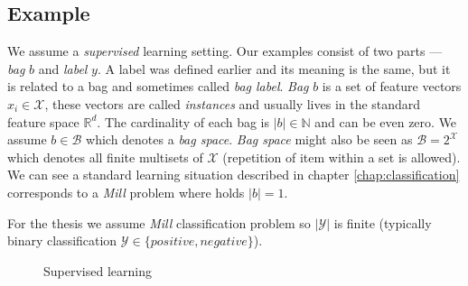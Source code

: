 \subsection*{Example}
We assume a \emph{supervised} learning setting. Our examples consist of two parts --- \emph{bag} $b$ and \emph{label} $y$. A label was defined earlier and its meaning is the same, but it is related to a bag and sometimes called \emph{bag label}. \emph{Bag} $b$ is a set of feature vectors $x_i\in\mathcal{X}$, these vectors are called \emph{instances} and usually lives in the standard feature space $\mathbb{R}^{d}$. The cardinality of each bag is $|b| \in \mathbb{N}$ and can be even zero. We assume $b \in \mathcal{B}$ which denotes a \emph{bag space}. \emph{Bag space} might also be seen as $\mathcal{B} = 2^{\mathcal{X}}$ which denotes all finite multisets of $\mathcal{X}$ (repetition of item within a set is allowed). We can see a standard learning situation described in chapter \ref{chap:classification} corresponds to a \emph{Mill} problem where holds $|b| = 1$.

For the thesis we assume \emph{Mill} classification problem so $|\mathcal{Y}|$ is finite (typically binary classification $\mathcal{Y} \in \{positive, negative\}$). 

\begin{figure}
    \centering
    \par
    \caption{Supervised learning}
    \label{fig:mill}
\end{figure}

